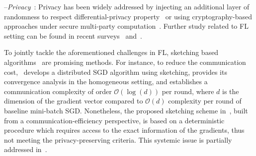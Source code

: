 \documentclass[sigconf, anonymous, review]{acmart}
\begin{document}
 --\emph{Privacy}~\citep{geyer2017differentially,hardy2017private}: Privacy has been widely addressed by injecting an additional layer of randomness to respect differential-privacy property~\citep{mcmahan2017learning} or using cryptography-based approaches under secure multi-party computation~\citep{bonawitz2017practical}. 
  Further study related to FL setting can be found in recent surveys~\citep{li2019federated} and~\citep{kairouz2019advances}.


To jointly tackle the aforementioned challenges in FL, sketching based algorithms~\citep{DBLP:journals/tcs/CharikarCF04,cormode2005improved,kleinberg2003bursty,Proc:Li_Church_Hastie_NIPS08} 
are promising methods. 
For instance, to reduce the communication cost,~\citep{ivkin2019communication} develops a distributed SGD algorithm using sketching, provides its convergence analysis in the homogeneous setting, and establishes a communication complexity of order $\mathcal{O}(\log(d))$ per round, where $d$ is the dimension of the gradient vector compared to $\mathcal{O}(d)$ complexity per round of baseline mini-batch SGD. Nonetheless, the proposed sketching scheme in~\citep{ivkin2019communication}, built from a communication-efficiency perspective, is based on a deterministic procedure which requires access to the exact information of the gradients, thus not meeting the  privacy-preserving criteria.
This systemic issue is partially addressed in~\citep{rothchild2020fetchsgd}. 
\end{document}
